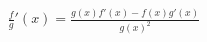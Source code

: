 \documentclass[preview]{standalone}
\begin{document}
\begin{align*}
\frac{f}{g}'(x) = \frac{g(x) f'(x) - f(x) g'(x)} {g(x)^2}
\end{align*}
\end{document}
